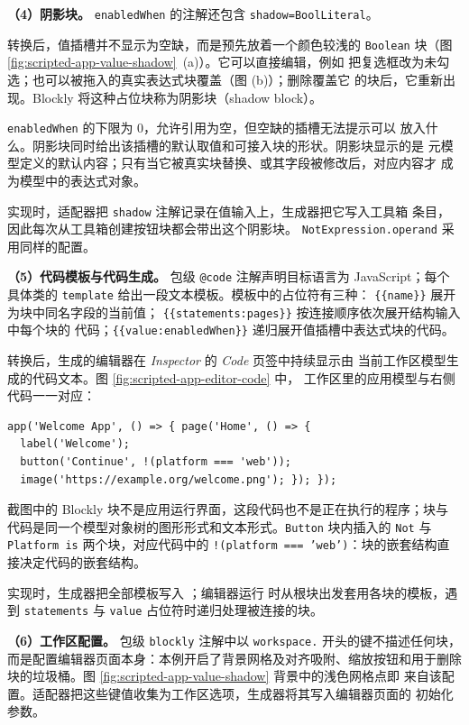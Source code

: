 \textbf{（4）阴影块。}
\texttt{enabledWhen} 的注解还包含 \texttt{shadow=BoolLiteral}。

转换后，值插槽并不显示为空缺，而是预先放着一个颜色较浅的 \texttt{Boolean}
块（图 \ref{fig:scripted-app-value-shadow}~(a)）。它可以直接编辑，例如
把复选框改为未勾选；也可以被拖入的真实表达式块覆盖（图 (b)）；删除覆盖它
的块后，它重新出现。Blockly 将这种占位块称为阴影块（shadow block）。

\texttt{enabledWhen} 的下限为 0，允许引用为空，但空缺的插槽无法提示可以
放入什么。阴影块同时给出该插槽的默认取值和可接入块的形状。阴影块显示的是
元模型定义的默认内容；只有当它被真实块替换、或其字段被修改后，对应内容才
成为模型中的表达式对象。

实现时，适配器把 \texttt{shadow} 注解记录在值输入上，生成器把它写入工具箱
条目，因此每次从工具箱创建按钮块都会带出这个阴影块。
\texttt{NotExpression.operand} 采用同样的配置。

\textbf{（5）代码模板与代码生成。}
包级 \texttt{@code} 注解声明目标语言为 JavaScript；每个具体类的
\texttt{template} 给出一段文本模板。模板中的占位符有三种：
\texttt{\{\{name\}\}} 展开为块中同名字段的当前值；
\texttt{\{\{statements:pages\}\}} 按连接顺序依次展开结构输入中每个块的
代码；\texttt{\{\{value:enabledWhen\}\}} 递归展开值插槽中表达式块的代码。

转换后，生成的编辑器在 \emph{Inspector} 的 \emph{Code} 页签中持续显示由
当前工作区模型生成的代码文本。图 \ref{fig:scripted-app-editor-code} 中，
工作区里的应用模型与右侧代码一一对应：

\begin{lstlisting}[style=tfmjavascript, captionpos=t,
caption={图 \ref{fig:scripted-app-editor-code} 中模型生成的代码},
label={lst:scripted-app-generated-code}]
app('Welcome App', () => { page('Home', () => {
  label('Welcome');
  button('Continue', !(platform === 'web'));
  image('https://example.org/welcome.png'); }); });
\end{lstlisting}

截图中的 Blockly 块不是应用运行界面，这段代码也不是正在执行的程序；块与
代码是同一个模型对象树的图形形式和文本形式。\texttt{Button} 块内插入的
\texttt{Not} 与 \texttt{Platform is} 两个块，对应代码中的
\texttt{!(platform === 'web')}：块的嵌套结构直接决定代码的嵌套结构。

实现时，生成器把全部模板写入 ；编辑器运行
时从根块出发套用各块的模板，遇到 \texttt{statements} 与 \texttt{value}
占位符时递归处理被连接的块。

\textbf{（6）工作区配置。}
包级 \texttt{blockly} 注解中以 \texttt{workspace.} 开头的键不描述任何块，
而是配置编辑器页面本身：本例开启了背景网格及对齐吸附、缩放按钮和用于删除
块的垃圾桶。图 \ref{fig:scripted-app-value-shadow} 背景中的浅色网格点即
来自该配置。适配器把这些键值收集为工作区选项，生成器将其写入编辑器页面的
初始化参数。

